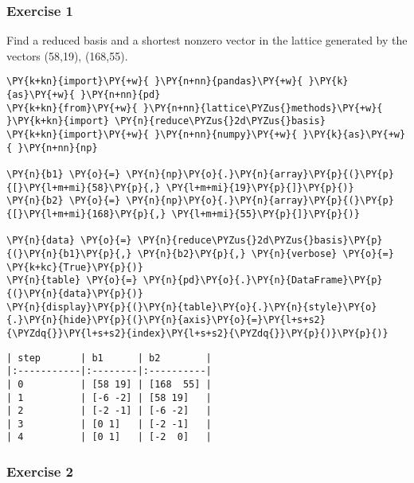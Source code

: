\documentclass[a4paper,12pt]{article}
\begin{document}
\subsubsection{Exercise 1}\label{exercise-1}

Find a reduced basis and a shortest nonzero vector in the lattice
generated by the vectors (58,19), (168,55).

    \begin{tcolorbox}[breakable, size=fbox, boxrule=1pt, pad at break*=1mm,colback=cellbackground, colframe=cellborder]
\begin{Verbatim}[commandchars=\\\{\}]
\PY{k+kn}{import}\PY{+w}{ }\PY{n+nn}{pandas}\PY{+w}{ }\PY{k}{as}\PY{+w}{ }\PY{n+nn}{pd}
\PY{k+kn}{from}\PY{+w}{ }\PY{n+nn}{lattice\PYZus{}methods}\PY{+w}{ }\PY{k+kn}{import} \PY{n}{reduce\PYZus{}2d\PYZus{}basis}
\PY{k+kn}{import}\PY{+w}{ }\PY{n+nn}{numpy}\PY{+w}{ }\PY{k}{as}\PY{+w}{ }\PY{n+nn}{np}

\PY{n}{b1} \PY{o}{=} \PY{n}{np}\PY{o}{.}\PY{n}{array}\PY{p}{(}\PY{p}{[}\PY{l+m+mi}{58}\PY{p}{,} \PY{l+m+mi}{19}\PY{p}{]}\PY{p}{)}
\PY{n}{b2} \PY{o}{=} \PY{n}{np}\PY{o}{.}\PY{n}{array}\PY{p}{(}\PY{p}{[}\PY{l+m+mi}{168}\PY{p}{,} \PY{l+m+mi}{55}\PY{p}{]}\PY{p}{)}

\PY{n}{data} \PY{o}{=} \PY{n}{reduce\PYZus{}2d\PYZus{}basis}\PY{p}{(}\PY{n}{b1}\PY{p}{,} \PY{n}{b2}\PY{p}{,} \PY{n}{verbose} \PY{o}{=} \PY{k+kc}{True}\PY{p}{)}
\PY{n}{table} \PY{o}{=} \PY{n}{pd}\PY{o}{.}\PY{n}{DataFrame}\PY{p}{(}\PY{n}{data}\PY{p}{)}
\PY{n}{display}\PY{p}{(}\PY{n}{table}\PY{o}{.}\PY{n}{style}\PY{o}{.}\PY{n}{hide}\PY{p}{(}\PY{n}{axis}\PY{o}{=}\PY{l+s+s2}{\PYZdq{}}\PY{l+s+s2}{index}\PY{l+s+s2}{\PYZdq{}}\PY{p}{)}\PY{p}{)}
\end{Verbatim}
\end{tcolorbox}

    
     \begin{Verbatim}[commandchars=\\\{\}]
| step       | b1      | b2        |
|:-----------|:--------|:----------|
| 0          | [58 19] | [168  55] |
| 1          | [-6 -2] | [58 19]   |
| 2          | [-2 -1] | [-6 -2]   |
| 3          | [0 1]   | [-2 -1]   |
| 4          | [0 1]   | [-2  0]   |
    \end{Verbatim}

    
    \subsubsection{Exercise 2}\label{exercise-2}
\end{document}
